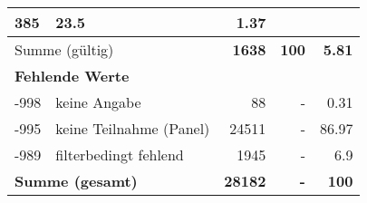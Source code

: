 \begin{longtable}{lXrrr}
       \num{385} &
       \num[round-mode=places,round-precision=2]{23.5} &
         \num[round-mode=places,round-precision=2]{1.37} \\
     \midrule
     \multicolumn{2}{l}{Summe (gültig)} &
       \textbf{\num{1638}} &
     \textbf{\num{100}} &
       \textbf{\num[round-mode=places,round-precision=2]{5.81}} \\
     \multicolumn{5}{l}{\textbf{Fehlende Werte}}\\
       -998 &
       keine Angabe &
         \num{88} &
        - &
         \num[round-mode=places,round-precision=2]{0.31} \\
       -995 &
       keine Teilnahme (Panel) &
         \num{24511} &
        - &
         \num[round-mode=places,round-precision=2]{86.97} \\
       -989 &
       filterbedingt fehlend &
         \num{1945} &
        - &
         \num[round-mode=places,round-precision=2]{6.9} \\
     \midrule
     \multicolumn{2}{l}{\textbf{Summe (gesamt)}} &
          \textbf{\num{28182}} &
        \textbf{-} &
        \textbf{\num{100}} \\
     \bottomrule
     \end{longtable}
     
